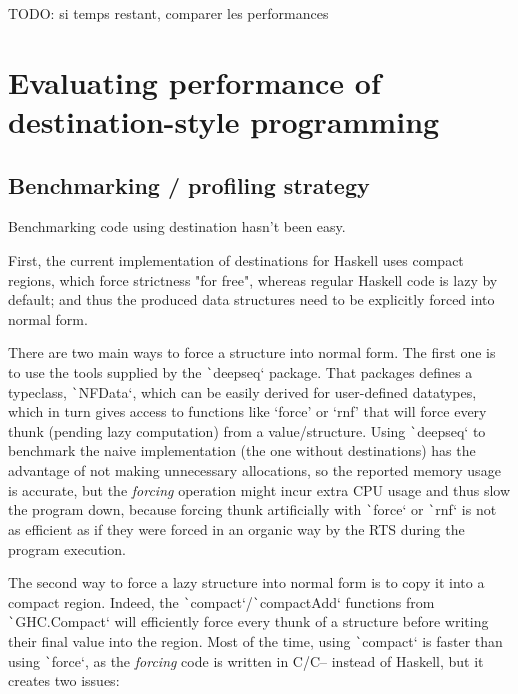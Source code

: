 \documentclass[english]{jflart}
\begin{document}
TODO: si temps restant, comparer les performances

\section{Evaluating performance of destination-style programming}

\subsection{Benchmarking / profiling strategy}

Benchmarking code using destination hasn't been easy.

First, the current implementation of destinations for Haskell uses compact regions, which force strictness "for free", whereas regular Haskell code is lazy by default; and thus the produced data structures need to be explicitly forced into normal form.

There are two main ways to force a structure into normal form. The first one is to use the tools supplied by the \texttt`deepseq` package. That packages defines a typeclass, \texttt`NFData`, which can be easily derived for user-defined datatypes, which in turn gives access to functions like `force' or `rnf' that will force every thunk (pending lazy computation) from a value/structure. Using \texttt`deepseq` to benchmark the naive implementation (the one without destinations) has the advantage of not making unnecessary allocations, so the reported memory usage is accurate, but the \emph{forcing} operation might incur extra CPU usage and thus slow the program down, because forcing thunk artificially with \texttt`force` or \texttt`rnf` is not as efficient as if they were forced in an organic way by the RTS during the program execution.

The second way to force a lazy structure into normal form is to copy it into a compact region. Indeed, the \texttt`compact`/\texttt`compactAdd` functions from \texttt`GHC.Compact` will efficiently force every thunk of a structure before writing their final value into the region. Most of the time, using \texttt`compact` is faster than using \texttt`force`, as the  \emph{forcing} code is written in C/C-- instead of Haskell, but it creates two issues:
\end{document}
